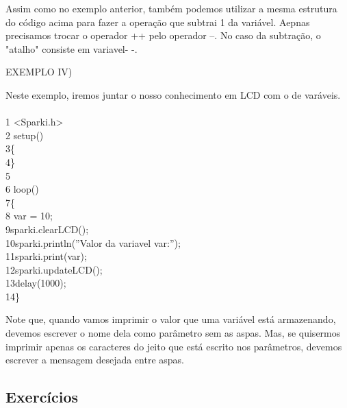 \documentclass[conference]{IEEEtran}
\begin{document}
    \par
    Assim como no exemplo anterior, também podemos utilizar a mesma estrutura do código acima para fazer a operação que subtrai 1 da variável. Aepnas precisamos trocar o operador {\selectfont ++} pelo operador {\selectfont --}. No caso da subtração, o "atalho" consiste em {\selectfont variavel- -}.
    \begin{center}
        EXEMPLO IV)
    \end{center}
    \par
    Neste exemplo, iremos juntar o nosso conhecimento em LCD com o de varáveis.
    \\
    \\
    {\selectfont 
    {\color{cinza}1} <Sparki.h>\\
    {\color{cinza}2} setup()\\
    {\color{cinza}3}\quad\{\\
    {\color{cinza}4}\quad\}\\
    {\color{cinza}5}\\
    {\color{cinza}6} loop()\\
    {\color{cinza}7}\quad\{\\
    {\color{cinza}8}\quad{} var = 10;\\
    {\color{cinza}9}\quad\quad sparki.clearLCD();\\
    {\color{cinza}10}\quad\quad sparki.println({\color{verde}''Valor da variavel var:'')};\\
    {\color{cinza}11}\quad\quad sparki.print(var);\\
    {\color{cinza}12}\quad\quad sparki.updateLCD();\\
    {\color{cinza}13}\quad\quad delay(1000);\\
    {\color{cinza}14}\quad\}}\\
    \par
    Note que, quando vamos imprimir o valor que uma variável está armazenando, devemos escrever o nome dela como parâmetro sem as aspas. Mas, se quisermos imprimir apenas os caracteres do jeito que está escrito nos parâmetros, devemos escrever a mensagem desejada entre aspas.
    \begin{center}
        \subsection{Exercícios}
    \end{center}
\end{document}
